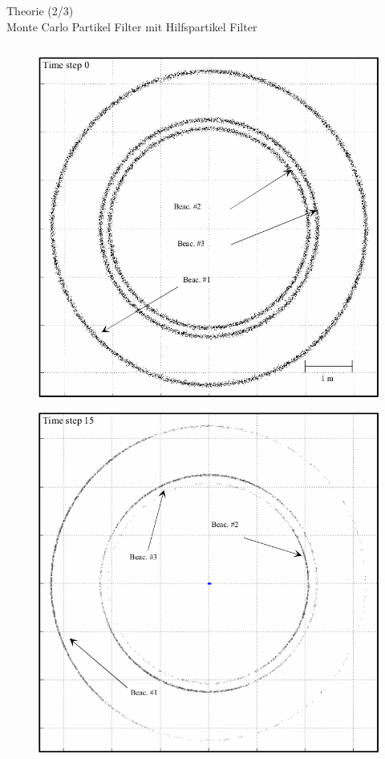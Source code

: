\documentclass{beamer}
\begin{document}
\begin{frame}{Theorie (2/3)\\\normalsize{Monte Carlo Partikel Filter mit Hilfspartikel Filter}}
	\begin{columns}
			\begin{overlayarea}{\textwidth}{.7\textheight}
				\only<1>
				{
					\begin{figure}
						\centering
						\includegraphics[width=\linewidth]{blanco2008pure_fig3e}
						\caption{\cite{blanco2008pure}}
					\end{figure}
				}
				{
					\begin{figure}
						\centering
						\includegraphics[width=\linewidth]{blanco2008pure_fig3f}

\end{figure}}
\end{overlayarea}
\end{columns}
\end{frame}
\end{document}
